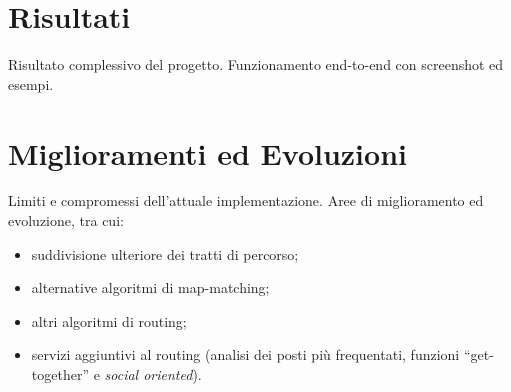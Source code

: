 \documentclass[a4paper, 12pt, twoside, openright]{book}
\begin{document}
\section{Risultati}
Risultato complessivo del progetto. Funzionamento end-to-end con screenshot ed esempi.
\section{Miglioramenti ed Evoluzioni}
Limiti e compromessi dell'attuale implementazione. Aree di miglioramento ed evoluzione, tra cui:
\begin{itemize}
\item suddivisione ulteriore dei tratti di percorso;
\item alternative algoritmi di map-matching;
\item altri algoritmi di routing;
\item servizi aggiuntivi al routing (analisi dei posti più frequentati, funzioni ``get-together'' e \emph{social oriented}).
\end{itemize}

\backmatter

\begingroup %
  \makeatletter
  \let\ps@plain\ps@empty
  \makeatother
  \printbibliography[
    heading=bibintoc,
    title={Bibliografia} ]
\endgroup
\end{document}
